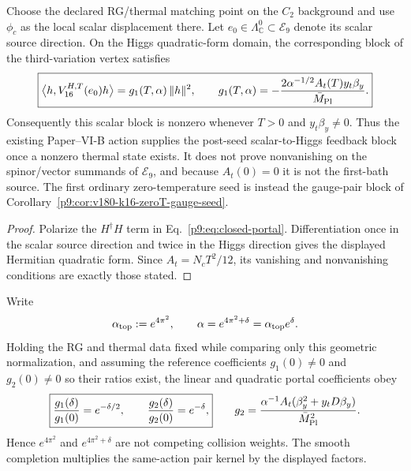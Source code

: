\documentclass[12pt,a4paper]{article}
\begin{document}
\begin{corollary}
\label{p9:cor:postseed-higgs-pair-vertex}
Choose the declared RG/thermal matching point on the \(C_2\) background and
use \(\phi_c\) as the local scalar displacement there.  Let
\(e_0\in\Lambda^0_{\mathbb C}\subset\mathcal E_9\) denote its scalar source
direction.  On the Higgs quadratic-form domain, the corresponding block of
the third-variation vertex satisfies
\begin{equation}
\label{p9:eq:postseed-higgs-pair-vertex}
 \boxed{
 \bigl\langle h,V_{16}^{H,T}(e_0)h\bigr\rangle
 =g_1(T,\alpha)\,\|h\|^2,
 \qquad
 g_1(T,\alpha)
 =-\frac{2\alpha^{-1/2}A_t(T)y_t\beta_y}{\bar M_{\rm Pl}}.}
\end{equation}
Consequently this scalar block is nonzero whenever
\(T>0\) and \(y_t\beta_y\ne0\).  Thus the existing Paper--VI-B action supplies the post-seed
scalar-to-Higgs feedback block once a nonzero thermal state exists.  It does
not prove nonvanishing on the spinor/vector summands of \(\mathcal E_9\), and
because \(A_t(0)=0\) it is not the first-bath source.  The first ordinary
zero-temperature seed is instead the gauge-pair block of
Corollary~\ref{p9:cor:v180-k16-zeroT-gauge-seed}.
\end{corollary}

\begin{proof}
Polarize the \(H^\dagger H\) term in
Eq.~\eqref{p9:eq:closed-portal}.  Differentiation once in the scalar source
direction and twice in the Higgs direction gives the displayed Hermitian
quadratic form.  Since \(A_t=N_cT^2/12\), its vanishing and nonvanishing
conditions are exactly those stated.
\end{proof}

\begin{corollary}
\label{p9:cor:alpha-delta-portal-factors}
Write
\[
 \alpha_{\rm top}:=e^{4\pi^2},
 \qquad \alpha=e^{4\pi^2+\delta}=\alpha_{\rm top}e^\delta.
\]
Holding the RG and thermal data fixed while comparing only this geometric
normalization, and assuming the reference coefficients
\(g_1(0)\ne0\) and \(g_2(0)\ne0\) so their ratios exist, the linear and
quadratic portal coefficients obey
\begin{equation}
\label{p9:eq:alpha-delta-portal-factors}
 \boxed{
 \frac{g_1(\delta)}{g_1(0)}=e^{-\delta/2},
 \qquad
 \frac{g_2(\delta)}{g_2(0)}=e^{-\delta},}
 \qquad
 g_2=
 \frac{\alpha^{-1}A_t(\beta_y^2+y_tD\beta_y)}
 {\bar M_{\rm Pl}^{2}}.
\end{equation}
Hence \(e^{4\pi^2}\) and \(e^{4\pi^2+\delta}\) are not competing collision
weights.  The smooth completion multiplies the same-action pair kernel by
the displayed factors.
\end{corollary}
\end{document}
